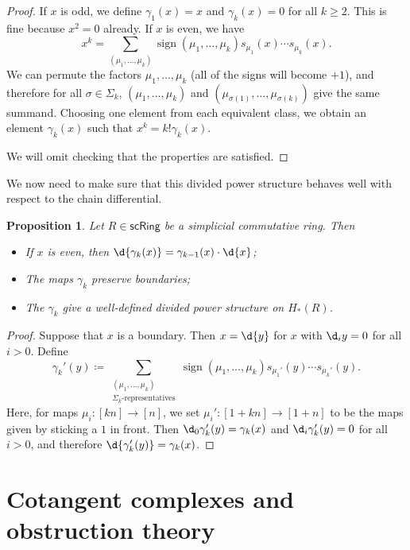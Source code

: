 \documentclass[10pt, oneside]{memoir}
\newtheorem{prop}[thm]{Proposition}
\theoremstyle{definition}
\theoremstyle{remark}
\theoremstyle{plain}
\theoremstyle{definition}
\theoremstyle{remark}
\newcommand{\on}[1]{\operatorname{#1}}
\newcommand{\ms}[1]{\mathsf{#1}}
\newcommand{\1}{\mathbf{1}}
\newcommand{\2}{\mathbf{2}}
\newcommand{\3}{\mathbf{3}}
\begin{document}
\begin{proof}
    If $x$ is odd, we define $\gamma_1(x) = x$ and $\gamma_k(x) = 0$ for all $k \geq 2$. This is fine because $x^2 = 0$ already. If $x$ is even, we have
    \[ x^k = \sum_{(\mu_1, \ldots, \mu_k)} \on{sign}(\mu_1, \ldots, \mu_k) s_{\mu_1}(x) \cdots s_{\mu_k}(x). \]
    We can permute the factors $\mu_1, \ldots, \mu_k$ (all of the signs will become $+1$), and therefore for all $\sigma \in \Sigma_k$, $(\mu_1, \ldots, \mu_k)$ and $(\mu_{\sigma(1)}, \ldots, \mu_{\sigma(k)})$ give the same summand. Choosing one element from each equivalent class, we obtain an element $\gamma_k(x)$ such that $x^k = k! \gamma_k(x)$.

    We will omit checking that the properties are satisfied.
\end{proof}

We now need to make sure that this divided power structure behaves well with respect to the chain differential.
\begin{prop}
    Let $R \in \ms{scRing}$ be a simplicial commutative ring. Then
    \begin{itemize}
        \item If $x$ is even, then $\d{\gamma_k(x)} = \gamma_{k-1}(x)\cdot \d{x}$;
        \item The maps $\gamma_k$ preserve boundaries;
        \item The $\gamma_k$ give a well-defined divided power structure on $H_*(R)$.
    \end{itemize}
\end{prop}

\begin{proof}
    Suppose that $x$ is a boundary. Then $x = \d{y}$ for $x$ with $\d_i y = 0$ for all $i > 0$. Define
    \[
        \gamma_k'(y) \coloneqq \sum_{\substack{(\mu_1, \ldots, \mu_k) \\ \Sigma_k \text{-representatives}}} \on{sign}(\mu_1, \ldots, \mu_k) s_{\mu_1'}(y) \cdots s_{\mu_k'}(y).
    \]
    Here, for maps $\mu_i \colon [kn] \to [n]$, we set $\mu_i' \colon [1+kn] \to [1+n]$ to be the maps given by sticking a $1$ in front. Then $\d_0 \gamma_k'(y) = \gamma_k(x)$ and $\d_i \gamma_k'(y) = 0$ for all $i > 0$, and therefore $\d{\gamma_k'(y)} = \gamma_k(x)$.
\end{proof}

\section{Cotangent complexes and obstruction theory}%
\label{sec:Cotangent complexes}
\end{document}
